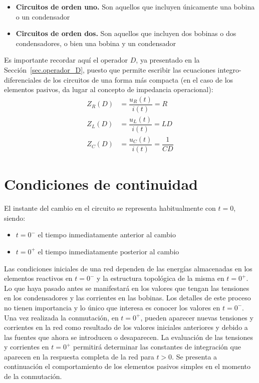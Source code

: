 \documentclass[11pt]{book} %
\begin{document}
	\begin{itemize}
	    \item \textbf{Circuitos de orden uno.} Son aquellos que incluyen únicamente una bobina o un condensador
	    \item \textbf{Circuitos de orden dos.} Son aquellos que incluyen dos bobinas o dos condensadores, o bien una bobina y  un condensador
	\end{itemize}

	\begin{remark}
	    Es importante recordar aquí el operador $D$, ya presentado en la Sección~\ref{sec.operador_D}, puesto que permite escribir las ecuaciones integro-diferenciales de los circuitos de una forma más compacta (en el caso de los elementos pasivos, da lugar al concepto de impedancia operacional):
	\begin{align*}
	    Z_R(D)&=\dfrac{u_R(t)}{i(t)}=R\\
	    Z_L(D)&=\dfrac{u_L(t)}{i(t)}=LD\\
	    Z_C(D)&=\dfrac{u_C(t)}{i(t)}=\dfrac{1}{CD}
	\end{align*}
	\end{remark}
		
	
	
	\section{Condiciones de continuidad}\label{sec.condiciones_iniciales}
	
	El instante del cambio en el circuito se representa habitualmente con $t = 0$, siendo:
    \begin{itemize}
    \item $t = 0^-$ el tiempo inmediatamente anterior al cambio
    \item $t = 0^+$ el tiempo inmediatamente posterior al cambio
    \end{itemize}
	Las condiciones iniciales de una red dependen de las energías almacenadas en los elementos reactivos en $t=0^-$ y la estructura topológica de la misma en $t=0^+$. Lo que haya pasado antes se manifestará en los valores que tengan las tensiones en los condensadores y las corrientes en las bobinas. Los detalles de este proceso no tienen importancia y lo único que interesa es conocer los valores en $t=0^-$. Una vez realizada la conmutación, en $t=0^+$, pueden aparecer nuevas tensiones y corrientes en la red como resultado de los valores iniciales anteriores y debido a las fuentes que ahora se introducen o desaparecen. La evaluación de las tensiones y corrientes en $t=0^+$ permitirá determinar las constantes de integración que aparecen en la respuesta completa de la red para $t>0$. Se presenta a continuación el comportamiento de los elementos pasivos simples en el momento de la conmutación.
	
\end{document}
